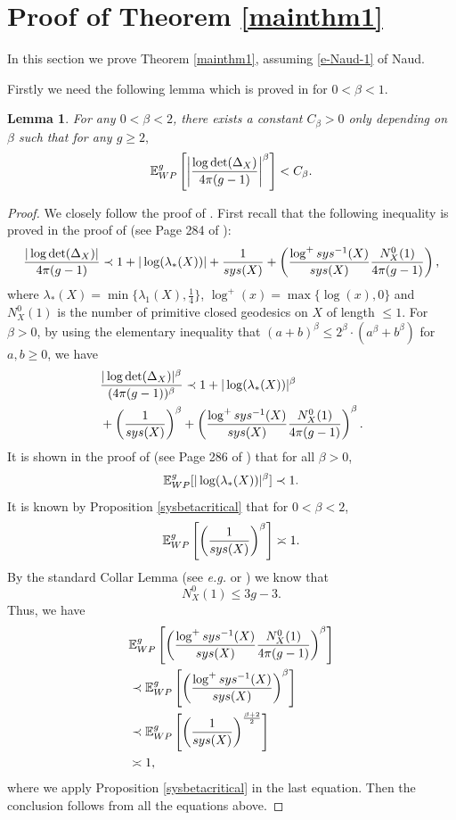 \documentclass[11pt]{amsart}
\makeatletter
\newcommand{\E}{\mathbb{E}_{\rm WP}^g}
\newcommand{\eg}{\textit{e.g.\@ }}
\def\sys{\mathop{\rm sys}}
\theoremstyle{plain}
\newtheorem{lemma}[theorem]{Lemma}
\newcommand{\be}{\begin{equation}}
\newcommand{\ene}{\end{equation}}
\theoremstyle{definition}
\theoremstyle{remark}
\makeatother
\begin{document}
\section{Proof of Theorem \ref{mainthm1}}\label{s-mt1}
In this section we prove Theorem \ref{mainthm1}, assuming \eqref{e-Naud-1} of Naud. 

Firstly we need the following lemma which is proved in \cite{naud2023determinants} for $0<\beta<1$. 
\begin{lemma}\label{finite-C-beta}
 For any $0<\beta<2$, there exists a constant $C_\beta>0$ only depending on $\beta$ such that for any $g\geq 2,$
$$\E\left[\left|\frac{\log \det (\Delta_X)}{4\pi(g-1)}\right|^\beta\right]<C_\beta.
 $$  
\end{lemma}

\begin{proof}
We closely follow the proof of \cite[Theorem 5.1]{naud2023determinants}. First recall that the following inequality is proved in the proof of \cite[Theorem 5.1]{naud2023determinants} (see Page 284 of \cite{naud2023determinants}):
\[\frac{|\log \det(\Delta_X)|}{4\pi(g-1)}\prec 1+|\log (\lambda_*(X))|+\frac{1}{\sys(X)}+\left(\frac{\log^+\sys^{-1}(X)}{\sys(X)}\frac{N_X^0(1)}{4\pi(g-1)}\right),\]
where  $\lambda_*(X)=\min\{\lambda_1(X),\frac{1}{4}\}$, $\log^+(x)=\max\{\log (x),0\}$  and  $N_X^0(1)$ is the number of primitive closed geodesics on $X$ of length $\leq 1$. For $\beta >0$, by using the elementary inequality that $(a+b)^\beta \leq 2^\beta\cdot (a^\beta+b^\beta) $ for $a,b\geq 0$, we have
\be
\begin{aligned}
&\frac{|\log \det(\Delta_X)|^\beta}{(4\pi(g-1))^\beta}\prec 1+|\log (\lambda_*(X))|^\beta\\
&+\left(\frac{1}{\sys(X)}\right)^\beta+\left(\frac{\log^+\sys^{-1}(X)}{\sys(X)}\frac{N_X^0(1)}{4\pi(g-1)}\right)^\beta.
\end{aligned}
\ene
It is shown in the proof of \cite[Theorem 5.1]{naud2023determinants} (see Page 286 of \cite{naud2023determinants}) that for all $\beta>0$,
\be
\E[ |\log(\lambda_*(X))|^\beta]\prec 1.
\ene
It is known by Proposition \ref{sysbetacritical} that for $0<\beta <2$,
\be
\E\left[ 
  \left( \frac{1}{\sys(X)} \right)^\beta\right] \asymp 1.
\ene
By the standard Collar Lemma (see \eg \cite{keen1974collars} or \cite{buser2010geometry}) we know that
\[ N_X^0(1)\leq 3g-3.\]
Thus, we have
\be
\begin{aligned}
&\E\left[\left(\frac{\log^+\sys^{-1}(X)}{\sys(X)}\frac{N_X^0(1)}{4\pi(g-1)}\right)^\beta \right]\\
 &\prec \E\left[ \left(\frac{\log^+\sys^{-1}(X)}{\sys(X)}\right)^\beta\right]\\
&\prec \E\left[ 
  \left( \frac{1}{\sys(X)} \right)^{\frac{\beta+2}{2}}\right] \\
&\asymp 1,
\end{aligned}
\ene
where we apply Proposition \ref{sysbetacritical} in the last equation. Then the conclusion follows from all the equations above.
\end{proof}
\end{document}
